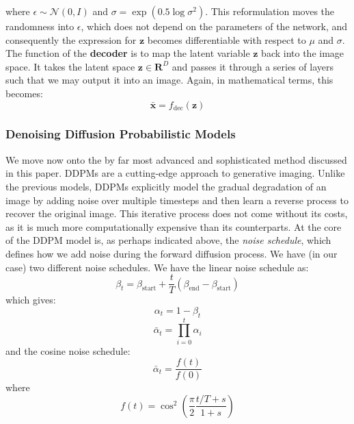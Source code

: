 \documentclass{article}
\begin{document}
where $\epsilon \sim \mathcal{N}(0, I)$ and $\sigma = \exp\left(0.5 \log \sigma^2\right)$. This reformulation moves the randomness into $\epsilon$, which does not depend on the parameters of the network, and consequently the expression for $\mathbf{z}$ becomes differentiable with respect to $\mu$ and $\sigma$.
\newline
The function of the \textbf{decoder} is to map the latent variable $\mathbf{z}$ back into the image space. It takes the latent space $\mathbf{z} \in \mathbf{R}^D$ and passes it through a series of layers such that we may output it into an image.
\newline
Again, in mathematical terms, this becomes:
\begin{equation}
    \mathbf{\bar x} = f_{\text{dec}}(\mathbf{z})
\end{equation}
\subsubsection{Denoising Diffusion Probabilistic Models}
We move now onto the by far most advanced and sophisticated method discussed in this paper. DDPMs are a cutting-edge approach to generative imaging. Unlike the previous models, DDPMs explicitly model the gradual degradation of an image by adding noise over multiple timesteps and then learn a reverse process to recover the original image. This iterative process does not come without its costs, as it is much more computationally expensive than its counterparts. \newline
At the core of the DDPM model is, as perhaps indicated above, the \emph{noise schedule}, which defines how we add noise during the forward diffusion process.
\newline
We have (in our case) two different noise schedules. We have the linear noise schedule as:
\begin{equation}
    \beta_t = \beta_{\text{start}} + \frac{t}{T} (\beta_{\text{end}} - \beta_{\text{start}})
\end{equation}
which gives:
\begin{equation*}
    \alpha_t = 1 - \beta_t
\end{equation*}
\begin{equation}
    \bar \alpha_t = \prod_{i=0}^t \alpha_i
\end{equation}
and the cosine noise schedule:
\begin{equation}
    \bar \alpha_t = \frac{f(t)}{f(0)}
\end{equation}
where
\begin{equation}
    f(t) = \cos^2 \left(\frac{\pi}{2} \frac{t/T + s}{1 + s} \right)
\end{equation}
\end{document}
